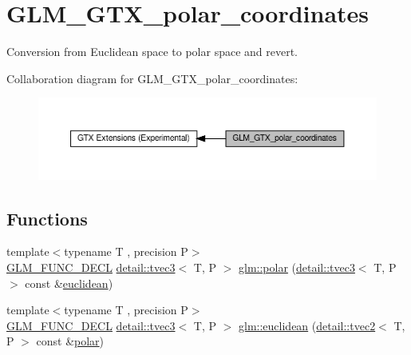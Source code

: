 \hypertarget{group__gtx__polar__coordinates}{}\section{G\+L\+M\+\_\+\+G\+T\+X\+\_\+polar\+\_\+coordinates}
\label{group__gtx__polar__coordinates}


Conversion from Euclidean space to polar space and revert.  


Collaboration diagram for G\+L\+M\+\_\+\+G\+T\+X\+\_\+polar\+\_\+coordinates\+:\nopagebreak
\begin{figure}[H]
\begin{center}
\leavevmode
\includegraphics[width=350pt]{group__gtx__polar__coordinates}
\end{center}
\end{figure}
\subsection*{Functions}
\begin{DoxyCompactItemize}
\item 
{\footnotesize template$<$typename T , precision P$>$ }\\\hyperlink{setup_8hpp_ab2d052de21a70539923e9bcbf6e83a51}{G\+L\+M\+\_\+\+F\+U\+N\+C\+\_\+\+D\+E\+CL} \hyperlink{structglm_1_1detail_1_1tvec3}{detail\+::tvec3}$<$ T, P $>$ \hyperlink{group__gtx__polar__coordinates_ga7d0a4068875efec56e5d2c6451b5bde2}{glm\+::polar} (\hyperlink{structglm_1_1detail_1_1tvec3}{detail\+::tvec3}$<$ T, P $>$ const \&\hyperlink{group__gtx__polar__coordinates_ga221eaf671619626425e9fb5cb69400b0}{euclidean})
\item 
{\footnotesize template$<$typename T , precision P$>$ }\\\hyperlink{setup_8hpp_ab2d052de21a70539923e9bcbf6e83a51}{G\+L\+M\+\_\+\+F\+U\+N\+C\+\_\+\+D\+E\+CL} \hyperlink{structglm_1_1detail_1_1tvec3}{detail\+::tvec3}$<$ T, P $>$ \hyperlink{group__gtx__polar__coordinates_ga221eaf671619626425e9fb5cb69400b0}{glm\+::euclidean} (\hyperlink{structglm_1_1detail_1_1tvec2}{detail\+::tvec2}$<$ T, P $>$ const \&\hyperlink{group__gtx__polar__coordinates_ga7d0a4068875efec56e5d2c6451b5bde2}{polar})
\end{DoxyCompactItemize}


